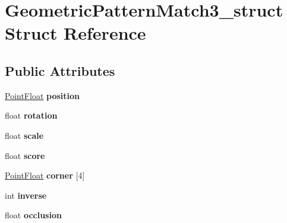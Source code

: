 \hypertarget{structGeometricPatternMatch3__struct}{
\section{GeometricPatternMatch3\_\-struct Struct Reference}
\label{structGeometricPatternMatch3__struct}
}
\subsection*{Public Attributes}
\begin{DoxyCompactItemize}
\item 
\hypertarget{structGeometricPatternMatch3__struct_a81412f1aa1b89d0f9cbf7c771ba1f6fa}{
\hyperlink{structPointFloat__struct}{PointFloat} {\bfseries position}}
\label{structGeometricPatternMatch3__struct_a81412f1aa1b89d0f9cbf7c771ba1f6fa}

\item 
\hypertarget{structGeometricPatternMatch3__struct_a6433ba890259a3a5fe472a165b519f08}{
float {\bfseries rotation}}
\label{structGeometricPatternMatch3__struct_a6433ba890259a3a5fe472a165b519f08}

\item 
\hypertarget{structGeometricPatternMatch3__struct_a6fc518d8274a312bfda682b3830a696a}{
float {\bfseries scale}}
\label{structGeometricPatternMatch3__struct_a6fc518d8274a312bfda682b3830a696a}

\item 
\hypertarget{structGeometricPatternMatch3__struct_aa68bee86c8322634f23d35d3ba3d709e}{
float {\bfseries score}}
\label{structGeometricPatternMatch3__struct_aa68bee86c8322634f23d35d3ba3d709e}

\item 
\hypertarget{structGeometricPatternMatch3__struct_ab1eb8c9666e382a31212c007429f00f5}{
\hyperlink{structPointFloat__struct}{PointFloat} {\bfseries corner} \mbox{[}4\mbox{]}}
\label{structGeometricPatternMatch3__struct_ab1eb8c9666e382a31212c007429f00f5}

\item 
\hypertarget{structGeometricPatternMatch3__struct_a525a6994177af94850748075357d68dc}{
int {\bfseries inverse}}
\label{structGeometricPatternMatch3__struct_a525a6994177af94850748075357d68dc}

\item 
\hypertarget{structGeometricPatternMatch3__struct_a753e3a38b696bbd13aa01cd14a5f11e9}{
float {\bfseries occlusion}}
\label{structGeometricPatternMatch3__struct_a753e3a38b696bbd13aa01cd14a5f11e9}


\end{DoxyCompactItemize}
